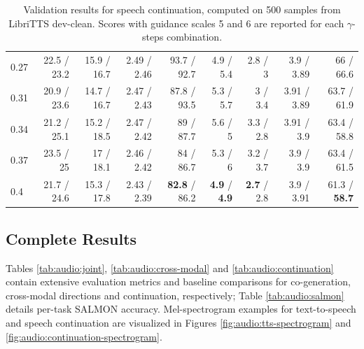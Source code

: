 \begin{table}[t]
\begin{tabular}{l rrrrrrrr}
0.27 & 22.5 / 23.2 & 15.9 / 16.7 & 2.49 / 2.46 & 93.7 / 92.7 & 4.9 / 5.4 & 2.8 / 3 & 3.9 / 3.89 & 66 / 66.6 \\
0.31 & 20.9 / 23.6 & 14.7 / 16.7 & 2.47 / 2.43 & 87.8 / 93.5 & 5.3 / 5.7 & 3 / 3.4 & 3.91 / 3.89 & 63.7 / 61.9 \\
0.34 & 21.2 / 25.1 & 15.2 / 18.5 & 2.47 / 2.42 & 89 / 87.7 & 5.6 / 5 & 3.3 / 2.8 & 3.91 / 3.9 & 63.4 / 58.8 \\
0.37 & 23.5 / 25 & 17 / 18.1 & 2.46 / 2.42 & 84 / 86.7 & 5.3 / 6 & 3.2 / 3.7 & 3.9 / 3.9 & 63.4 / 61.5 \\
0.4 & 21.7 / 24.6 & 15.3 / 17.8 & 2.43 / 2.39 & \textbf{82.8} / 86.2 & \textbf{4.9} / \textbf{4.9} & \textbf{2.7} / 2.8 & 3.9 / 3.91 & 61.3 / \textbf{58.7} \\
\bottomrule
\end{tabular}
\caption{Validation results for speech continuation, computed on 500 samples from LibriTTS dev-clean. Scores with guidance scales 5 and 6 are reported for each $\gamma$-steps combination.}
\label{tab:audio:val:cont}
\end{table}

\subsection{Complete Results} \label{app:audio:results}

Tables \ref{tab:audio:joint}, \ref{tab:audio:cross-modal} and \ref{tab:audio:continuation} contain extensive evaluation metrics and baseline comparisons for co-generation, cross-modal directions and continuation, respectively; Table \ref{tab:audio:salmon} details per-task SALMON accuracy. Mel-spectrogram examples for text-to-speech and speech continuation are visualized in Figures \ref{fig:audio:tts-spectrogram} and \ref{fig:audio:continuation-spectrogram}.

